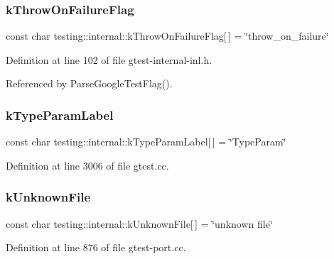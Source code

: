 \subsubsection{\texorpdfstring{k\+Throw\+On\+Failure\+Flag}{kThrowOnFailureFlag}}
{\footnotesize\ttfamily const char testing\+::internal\+::k\+Throw\+On\+Failure\+Flag\mbox{[}$\,$\mbox{]} = \char`\"{}throw\+\_\+on\+\_\+failure\char`\"{}}



Definition at line 102 of file gtest-\/internal-\/inl.\+h.



Referenced by Parse\+Google\+Test\+Flag().

\mbox{\label{namespacetesting_1_1internal_ae6e5e31b85dac8586d4cc1ab1671f438}} 
\subsubsection{\texorpdfstring{k\+Type\+Param\+Label}{kTypeParamLabel}}
{\footnotesize\ttfamily const char testing\+::internal\+::k\+Type\+Param\+Label\mbox{[}$\,$\mbox{]} = \char`\"{}Type\+Param\char`\"{}\hspace{0.3cm}{\ttfamily [static]}}



Definition at line 3006 of file gtest.\+cc.

\mbox{\label{namespacetesting_1_1internal_abae7a5775c901f2fd12b058b00d09840}} 
\subsubsection{\texorpdfstring{k\+Unknown\+File}{kUnknownFile}}
{\footnotesize\ttfamily const char testing\+::internal\+::k\+Unknown\+File\mbox{[}$\,$\mbox{]} = \char`\"{}unknown file\char`\"{}}



Definition at line 876 of file gtest-\/port.\+cc.

\mbox{\label{namespacetesting_1_1internal_ae57eee0bf5371ff8e9688fb4464bc62b}} 
